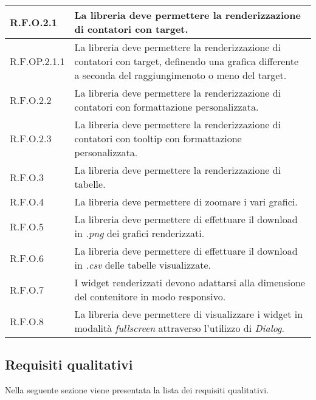 \begin{center}
\begin{longtable}{|p{2.5cm}|p{10cm}|}
        \hline
        R.F.O.2.1          & La libreria deve permettere la renderizzazione di contatori con target.                                   \\
        \hline
        R.F.OP.2.1.1       & La libreria deve permettere la renderizzazione di contatori con target, definendo una grafica
        differente a seconda del raggiungimenoto o meno del target.                                                                    \\
        \hline
        R.F.O.2.2          & La libreria deve permettere la renderizzazione di contatori con formattazione personalizzata.             \\
        \hline
        R.F.O.2.3          & La libreria deve permettere la renderizzazione di contatori con tooltip con formattazione personalizzata. \\
        \hline
        R.F.O.3            & La libreria deve permettere la renderizzazione di tabelle.                                                \\
        \hline
        R.F.O.4            & La libreria deve permettere di zoomare i vari grafici.                                                    \\
        \hline
        R.F.O.5            & La libreria deve permettere di effettuare il download in \textit{.png} dei grafici renderizzati.          \\
        \hline
        R.F.O.6            & La libreria deve permettere di effettuare il download in \textit{.csv} delle tabelle visualizzate.        \\
        \hline
        R.F.O.7            & I widget renderizzati devono adattarsi alla dimensione del contenitore in modo responsivo.                \\
        \hline
        R.F.O.8            & La libreria deve permettere di visualizzare i widget in modalità \textit{fullscreen} attraverso
        l'utilizzo di \textit{Dialog}.                                                                                                 \\
    \end{longtable}
    \label{tab:requisiti_funzionali}
\end{center}

\subsection{Requisiti qualitativi}
Nella seguente sezione viene presentata la lista dei requisiti qualitativi.

